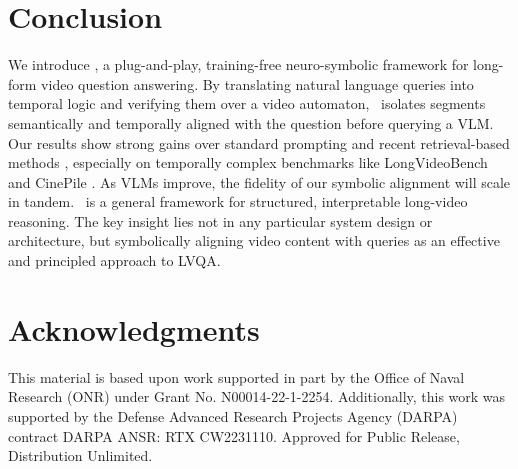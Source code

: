 \documentclass[letterpaper]{article} %
\begin{document}

\section{Conclusion}
    We introduce \nsvqa, a plug-and-play, training-free neuro-symbolic framework for long-form video question answering. By translating natural language queries into temporal logic and verifying them over a video automaton, \nsvqa\ isolates segments semantically and temporally aligned with the question before querying a VLM. Our results show strong gains over standard prompting and recent retrieval-based methods \citep{wang2025videotree, park2024too}, especially on temporally complex benchmarks like LongVideoBench and CinePile \citep{wu2024longvideobench, rawal2024cinepile}. As VLMs improve, the fidelity of our symbolic alignment will scale in tandem. \nsvqa\ is a general framework for structured, interpretable long-video reasoning. The key insight lies not in any particular system design or architecture, but symbolically aligning video content with queries as an effective and principled approach to LVQA.

\section*{Acknowledgments}
This material is based upon work supported in part by the Office of Naval Research (ONR) under Grant No. N00014-22-1-2254. Additionally, this work was supported by the Defense Advanced Research Projects Agency (DARPA) contract DARPA ANSR: RTX CW2231110. Approved for Public Release, Distribution Unlimited.



% 
\end{document}
